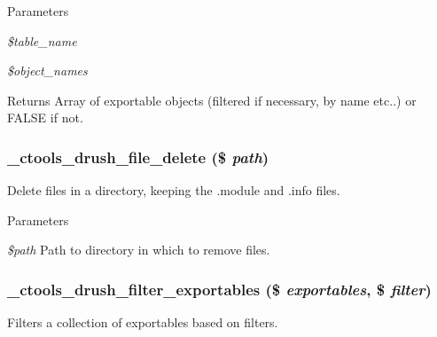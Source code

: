 \begin{DoxyParams}{Parameters}
\item[{\em \$table\_\-name}]\item[{\em \$object\_\-names}]\end{DoxyParams}
\begin{DoxyReturn}{Returns}
Array of exportable objects (filtered if necessary, by name etc..) or FALSE if not. 
\end{DoxyReturn}
\hypertarget{ctools_8drush_8inc_acc9c99f00479096071cb2516350148af}{
\subsubsection[{\_\-ctools\_\-drush\_\-file\_\-delete}]{\setlength{\rightskip}{0pt plus 5cm}\_\-ctools\_\-drush\_\-file\_\-delete (\$ {\em path})}}
\label{ctools_8drush_8inc_acc9c99f00479096071cb2516350148af}
Delete files in a directory, keeping the .module and .info files.


\begin{DoxyParams}{Parameters}
\item[{\em \$path}]Path to directory in which to remove files. \end{DoxyParams}
\hypertarget{ctools_8drush_8inc_aed8b85aea23dc7f24f9c733712bdb4f3}{
\subsubsection[{\_\-ctools\_\-drush\_\-filter\_\-exportables}]{\setlength{\rightskip}{0pt plus 5cm}\_\-ctools\_\-drush\_\-filter\_\-exportables (\$ {\em exportables}, \/  \$ {\em filter})}}
\label{ctools_8drush_8inc_aed8b85aea23dc7f24f9c733712bdb4f3}
Filters a collection of exportables based on filters.


